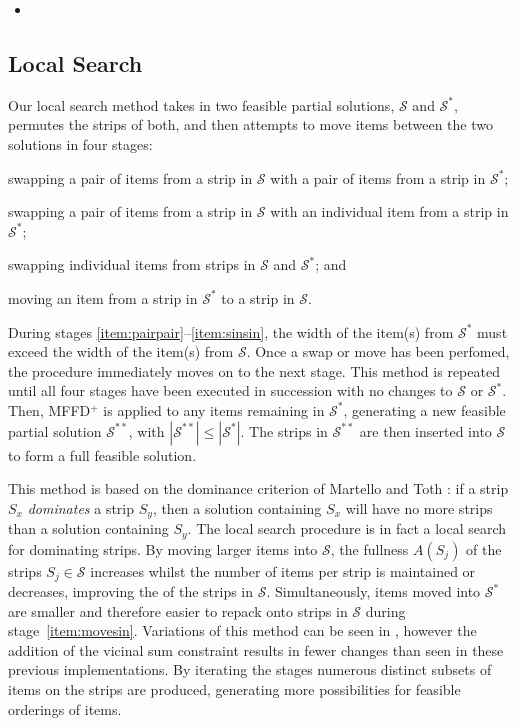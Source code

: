 \documentclass{elsarticle}
\begin{document}
{\color{myRed}
\begin{itemize}[leftmargin=*]
	\item
\end{itemize}
}

\subsection{Local Search}
\label{sub:localsearch}
\noindent Our local search method takes in two feasible partial solutions, $\mathcal{S}$ and $\mathcal{S}^*$, permutes the strips of both, and then attempts to move items between the two solutions in four stages: 
\begin{enumerate*}[label={(\roman*)}]
	\item swapping a pair of items from a strip in $\mathcal{S}$ with a pair of items from a strip in $\mathcal{S}^*$;\label{item:pairpair}
	\item swapping a pair of items from a strip in $\mathcal{S}$ with an individual item from a strip in $\mathcal{S}^*$;\label{item:pairsin}
	\item swapping individual items from strips in $\mathcal{S}$ and $\mathcal{S}^*$;\label{item:sinsin} and
	\item moving an item from a strip in $\mathcal{S}^*$ to a strip in $\mathcal{S}$.\label{item:movesin}
\end{enumerate*} 
During stages \ref{item:pairpair}--\ref{item:sinsin}, the width of the item(s) from $\mathcal{S}^*$ must exceed the width of the item(s) from $\mathcal{S}$. Once a swap or move has been perfomed, the procedure immediately moves on to the next stage. This method is repeated until all four stages have been executed in succession with no changes to $\mathcal{S}$ or $\mathcal{S}^*$. Then, MFFD$^+$ is applied to any items remaining in $\mathcal{S}^*$, generating a new feasible partial solution $\mathcal{S}^{**}$, with $|\mathcal{S}^{**}| \leq |\mathcal{S}^*|$. The strips in $\mathcal{S}^{**}$ are then inserted into $\mathcal{S}$ to form a full feasible solution.

This method is based on the dominance criterion of Martello and Toth \cite{martello1990l}: if a strip $S_x$ \emph{dominates} a strip $S_y$, then a solution containing $S_x$ will have no more strips than a solution containing $S_y$. The local search procedure is in fact a local search for dominating strips. By moving larger items into $\mathcal{S}$, the fullness $A(S_j)$ of the strips  $S_j \in \mathcal{S}$ increases whilst the number of items per strip is maintained or decreases, improving the  of the strips in $\mathcal{S}$. Simultaneously, items moved into $\mathcal{S}^*$ are smaller and therefore easier to repack onto strips in $\mathcal{S}$ during stage~\ref{item:movesin}. Variations of this method can be seen in \cite{lewis2009, lewis2017, falkenauer1996, levine2004}, however the addition of the vicinal sum constraint results in fewer changes than seen in these previous implementations. By iterating the stages numerous distinct subsets of items on the strips are produced, generating more possibilities for feasible orderings of items.
\end{document}
